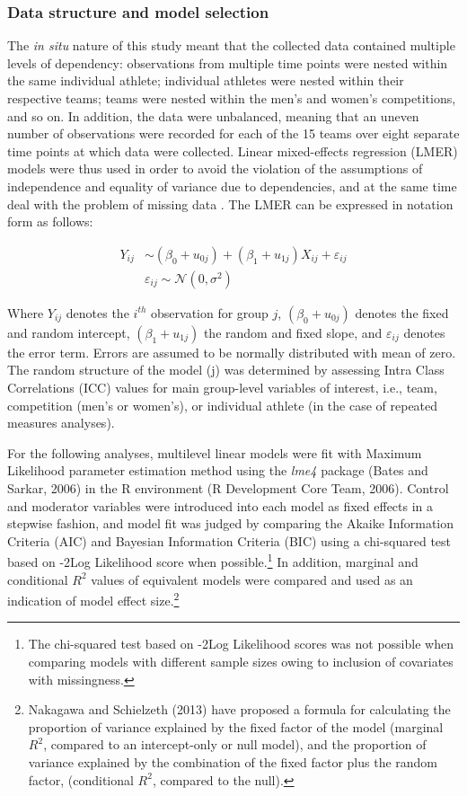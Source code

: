 \begin{CJK}{UTF8}{gbsn}
\subsubsection{Data structure and model selection\label{survey:dataStructureModelSelection}}
The \textit{in situ} nature of this study meant that the collected data contained multiple levels of dependency: observations from multiple time points were nested within the same individual athlete; individual athletes were nested within their respective teams; teams were nested within the men’s and women’s competitions, and so on.  In addition, the data were unbalanced, meaning that an uneven number of observations were recorded for each of the 15 teams over eight separate time points at which data were collected.  Linear mixed-effects regression (LMER) models were thus used in order to avoid the violation of the assumptions of independence and equality of variance due to dependencies, and at the same time deal with the problem of missing data \citep{Quene2004,Field2012}.  The LMER can be expressed in notation form as follows:

    \begin{align*}
      Y_{ij} & \sim  (\beta_{0} + u_{0j}) + (\beta_{1} + u_{1j})X_{ij} + \varepsilon_{ij}\\
           & \varepsilon_{ij} \sim \mathcal{N}(0,\sigma^{2})
    \end{align*}

Where $Y_{ij}$ denotes the $i^{th}$ observation for group $j$, $(\beta_{0} + u_{0j})$ denotes the fixed and random intercept, $(\beta_{1} + u_{1j})$ the random and fixed slope, and $\varepsilon_{ij}$ denotes the error term.  Errors are assumed to be normally distributed with mean of zero.  The random structure of the model (j) was determined by assessing Intra Class Correlations (ICC) values for main group-level variables of interest, i.e., team, competition (men's or women's), or individual athlete (in the case of repeated measures analyses).

For the following analyses, multilevel linear models were fit with Maximum Likelihood parameter estimation method using the \textit{lme4} package (Bates and Sarkar, 2006) in the R environment (R Development Core Team, 2006).  Control and moderator variables were introduced into each model as fixed effects in a stepwise fashion, and model fit was judged by comparing the Akaike Information Criteria (AIC) and Bayesian Information Criteria (BIC) using a chi-squared test based on -2Log Likelihood score when possible.\footnote{The chi-squared test based on -2Log Likelihood scores was not possible when comparing models with different sample sizes owing to inclusion of covariates with missingness.} In addition, marginal and conditional $R^2$ values of equivalent models were compared and used as an indication of model effect size.\footnote{Nakagawa and Schielzeth (2013) have proposed a formula for calculating the proportion of variance explained by the fixed factor of the model (marginal $R^2$, compared to an intercept-only or null model), and the proportion of variance explained by the combination of the fixed factor plus the random factor, (conditional $R^2$, compared to the null).}


\end{CJK}
